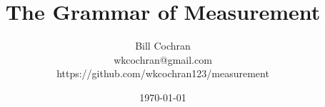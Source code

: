 \documentclass[12pt,oneside]{book}
\begin{document}
\title{The Grammar of Measurement}
\author{Bill Cochran\\wkcochran@gmail.com\\https://github.com/wkcochran123/measurement}
\date{\today}
\maketitle

\frontmatter
\onehalfspacing


\tableofcontents

\mainmatter











\backmatter
\end{document}

